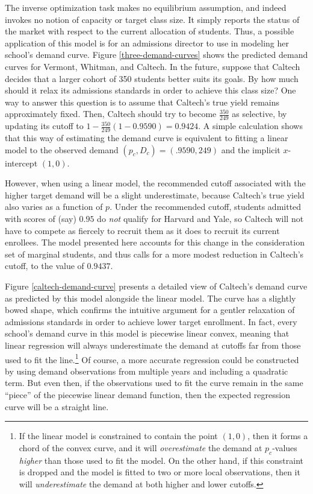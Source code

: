 \documentclass[12pt]{article}
\numberwithin{equation}{subsection}
\theoremstyle{definition}
\begin{document}
The inverse optimization task makes no equilibrium assumption, and indeed invokes no notion of capacity or target class size. It simply reports the status of the market with respect to the current allocation of students. Thus, a possible application of this model is for an admissions director to use in modeling her school's demand curve. Figure \ref{three-demand-curves} shows the predicted demand curves for Vermont, Whitman, and Caltech. In the future, suppose that Caltech decides that a larger cohort of 350 students better suits its goals. By how much should it relax its admissions standards in order to achieve this class size? One way to answer this question is to assume that Caltech’s true yield remains approximately fixed. Then, Caltech should try to become $\frac{350}{249}$ as selective, by updating its cutoff to $1 - \frac{350}{249}(1 - 0.9590) = 0.9424$. A simple calculation shows that this way of estimating the demand curve is equivalent to fitting a linear model to the observed demand $(p_c, D_c) = (.9590, 249)$ and the implicit $x$-intercept $(1, 0)$. 

However, when using a linear model, the recommended cutoff associated with the higher target demand will be a slight underestimate, because Caltech’s true yield also varies as a function of $p$. Under the recommended cutoff, students admitted with scores of (say) $0.95$ do \emph{not} qualify for Harvard and Yale, so Caltech will not have to compete as fiercely to recruit them as it does to recruit its current enrollees. The model presented here accounts for this change in the consideration set of marginal students, and thus calls for a more modest reduction in Caltech’s cutoff, to the value of $0.9437$.

Figure \ref{caltech-demand-curve} presents a detailed view of Caltech’s demand curve as predicted by this model alongside the linear model. The curve has a slightly bowed shape, which confirms the intuitive argument for a gentler relaxation of admissions standards in order to achieve lower target enrollment. In fact, every school’s demand curve in this model is piecewise linear convex, meaning that linear regression will always underestimate the demand at cutoffs far from those used to fit the line.\footnote{If the linear model is constrained to contain the point $(1, 0)$, then it forms a chord of the convex curve, and it will \emph{overestimate} the demand at $p_c$-values \emph{higher} than those used to fit the model. On the other hand, if this constraint is dropped and the model is fitted to two or more local observations, then it will \emph{underestimate} the demand at both higher and lower cutoffs.} Of course, a more accurate regression could be constructed by using demand observations from multiple years and including a quadratic term. But even then, if the observations used to fit the curve remain in the same ``piece'' of the piecewise linear demand function, then the expected regression curve will be a straight line.
\end{document}
